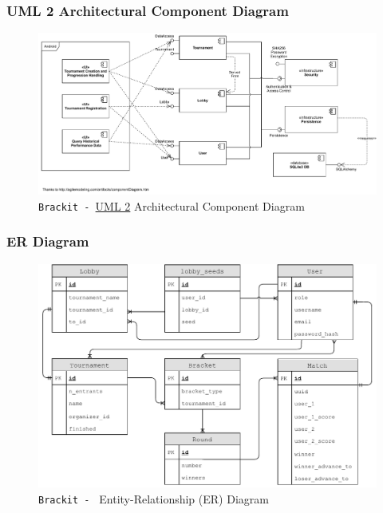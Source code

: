 \documentclass{article}
\begin{document}
\subsubsection{UML 2 Architectural Component Diagram}
\vfill
\begin{center}
    \begin{figure}[htp]
        \centering
        \includegraphics[width=14.5cm]{../diagrams/component_diag.pdf}
        \caption{\texttt{Brackit - }\href{https://sparxsystems.com/resources/tutorials/uml2/index.html}{UML 2} Architectural Component Diagram}
        \end{figure}
\end{center}
\vfill

\clearpage
\subsubsection{ER Diagram}
\vfill
\begin{center}
    \begin{figure}[h]
        \centering
        \includegraphics[width=12.5cm]{../diagrams/er_compressed.pdf}
        \caption{\texttt{Brackit - } Entity-Relationship (ER) Diagram}
        \end{figure}
\end{center}
\vfill
\clearpage
\end{document}
